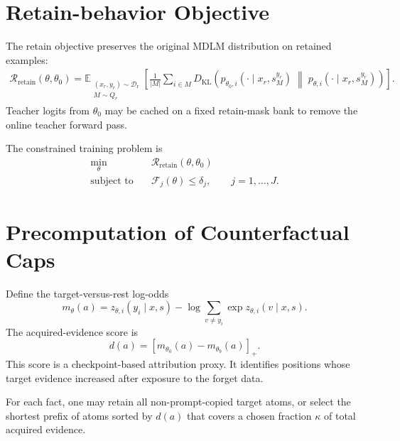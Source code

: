 \documentclass[11pt]{article}
\newcommand{\Dr}{\mathcal{D}_{\mathrm{r}}}
\newcommand{\KL}{D_{\mathrm{KL}}}
\newcommand{\relu}[1]{\left[#1\right]_{+}}
\begin{document}
\section{Retain-behavior Objective}

The retain objective preserves the original MDLM distribution on retained examples:
\begin{equation}
\label{eq:retain-loss}
\begin{aligned}
    \mathcal{R}_{\mathrm{retain}}(\theta,\theta_0)
    = \mathbb{E}_{\substack{(x_r,y_r)\sim\Dr\\M\sim Q_r}}
    \left[
        \frac{1}{|M|}
        \sum_{i\in M}
        \KL\!\left(
            p_{\theta_0,i}(\cdot\mid x_r,s_M^{y_r})
            \;\middle\|\;
            p_{\theta,i}(\cdot\mid x_r,s_M^{y_r})
        \right)
    \right].
\end{aligned}
\end{equation}
Teacher logits from $\theta_0$ may be cached on a fixed retain-mask bank to remove the online teacher forward pass.

The constrained training problem is
\begin{equation}
\label{eq:main-objective}
\boxed{
\begin{aligned}
    \min_{\theta}\quad
    & \mathcal{R}_{\mathrm{retain}}(\theta,\theta_0) \\
    \text{subject to}\quad
    & \mathcal{F}_j(\theta)\leq\delta_j,
      \qquad j=1,\ldots,J.
\end{aligned}
}
\end{equation}

\section{Precomputation of Counterfactual Caps}

Define the target-versus-rest log-odds
\begin{equation}
    m_{\theta}(a)
    = z_{\theta,i}(y_i\mid x,s)
      - \log\sum_{v\neq y_i}\exp z_{\theta,i}(v\mid x,s).
\end{equation}
The acquired-evidence score is
\begin{equation}
    d(a)
    = \relu{m_{\theta_0}(a)-m_{\theta_b}(a)}.
\end{equation}
This score is a checkpoint-based attribution proxy. It identifies positions whose target evidence increased after exposure to the forget data.

For each fact, one may retain all non-prompt-copied target atoms, or select the shortest prefix of atoms sorted by $d(a)$ that covers a chosen fraction $\kappa$ of total acquired evidence.
\end{document}

